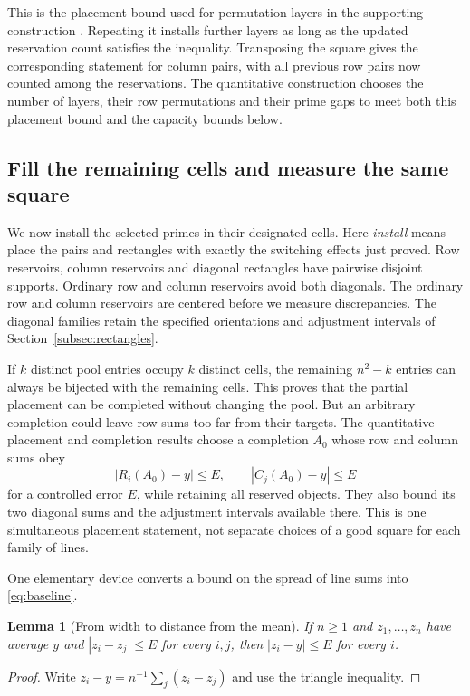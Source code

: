 \documentclass[11pt]{article}
\newtheorem{lemma}[theorem]{Lemma}
\theoremstyle{definition}
\begin{document}
This is the placement bound used for permutation layers in the supporting
construction \cite[Section 3.1]{Companion}. Repeating it installs further layers
as long as the updated reservation count satisfies the inequality. Transposing
the square gives the corresponding statement for column pairs, with all
previous row pairs now counted among the reservations. The quantitative
construction chooses the number of layers, their row permutations and their
prime gaps to meet both this placement bound and the capacity bounds below.

\subsection{Fill the remaining cells and measure the same square}

We now install the selected primes in their designated cells. Here
\emph{install} means place the pairs and rectangles with exactly the switching
effects just proved. Row reservoirs, column reservoirs and diagonal rectangles
have pairwise disjoint supports. Ordinary row and column reservoirs avoid
both diagonals. The ordinary row and column reservoirs are centered before
we measure discrepancies. The diagonal families retain the specified
orientations and adjustment intervals of Section~\ref{subsec:rectangles}.

If \(k\) distinct pool entries occupy \(k\) distinct cells, the remaining
\(n^2-k\) entries can always be bijected with the remaining cells. This proves
that the partial placement can be completed without changing the pool. But
an arbitrary completion could leave row sums too far from their targets. The
quantitative placement and completion results choose a completion \(A_0\)
whose row and column sums obey
\begin{equation}\label{eq:baseline}
 |R_i(A_0)-y|\le E,\qquad |C_j(A_0)-y|\le E
\end{equation}
for a controlled error \(E\), while retaining all reserved objects. They also
bound its two diagonal sums and the adjustment intervals available there.
This is one simultaneous placement statement, not separate choices of a good
square for each family of lines.

One elementary device converts a bound on the spread of line sums into
\eqref{eq:baseline}.
\begin{lemma}[From width to distance from the mean]\label{lem:width}
If \(n\ge1\) and \(z_1,\ldots,z_n\) have average \(y\) and \(|z_i-z_j|\le E\) for every
\(i,j\), then \(|z_i-y|\le E\) for every \(i\).
\end{lemma}
\begin{proof}
Write \(z_i-y=n^{-1}\sum_j(z_i-z_j)\) and use the triangle inequality.
\end{proof}
\end{document}
